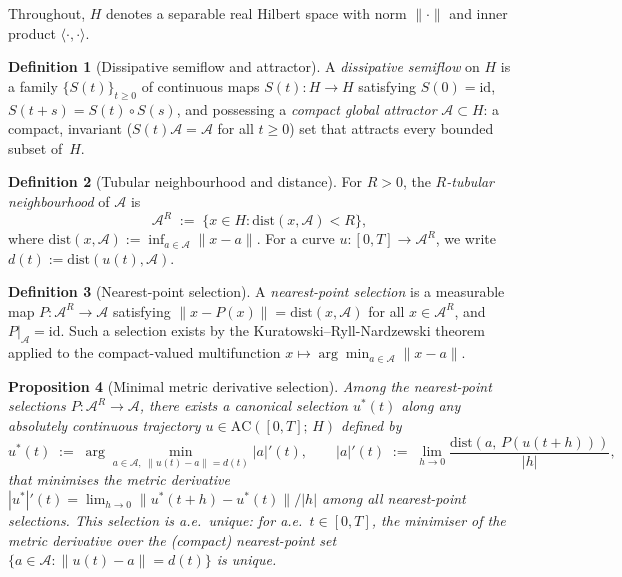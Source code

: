 \documentclass[12pt,a4paper]{article}
\theoremstyle{definition}
\newtheorem{definition}{Definition}[section]
\theoremstyle{plain}
\newtheorem{proposition}[definition]{Proposition}
\theoremstyle{remark}
\newcommand{\dist}{\mathrm{dist}}
\newcommand{\AC}{\mathrm{AC}}
\newcommand{\id}{\mathrm{id}}
\begin{document}
Throughout, $H$ denotes a separable real Hilbert space with norm
$\|\cdot\|$ and inner product $\langle\cdot,\cdot\rangle$.

\begin{definition}[Dissipative semiflow and attractor]
\label{def:semiflow}
A \emph{dissipative semiflow} on $H$ is a family
$\{S(t)\}_{t \ge 0}$ of continuous maps $S(t): H \to H$ satisfying
$S(0) = \id$, $S(t+s) = S(t) \circ S(s)$, and possessing a
\emph{compact global attractor}
$\mathcal{A} \subset H$: a compact, invariant
($S(t)\mathcal{A} = \mathcal{A}$ for all $t \ge 0$) set that
attracts every bounded subset of~$H$.
\end{definition}

\begin{definition}[Tubular neighbourhood and distance]
\label{def:tube}
For $R > 0$, the \emph{$R$-tubular neighbourhood} of $\mathcal{A}$ is
\[
  \mathcal{A}^R
  \;:=\;
  \{x \in H : \dist(x, \mathcal{A}) < R\},
\]
where $\dist(x, \mathcal{A}) := \inf_{a \in \mathcal{A}} \|x - a\|$.
For a curve $u: [0,T] \to \mathcal{A}^R$, we write
$d(t) := \dist(u(t), \mathcal{A})$.
\end{definition}

\begin{definition}[Nearest-point selection]
\label{def:selection}
A \emph{nearest-point selection} is a measurable map
$P: \mathcal{A}^R \to \mathcal{A}$ satisfying
$\|x - P(x)\| = \dist(x, \mathcal{A})$ for all
$x \in \mathcal{A}^R$, and $P|_{\mathcal{A}} = \id$.
Such a selection exists by the Kuratowski--Ryll-Nardzewski theorem
applied to the compact-valued multifunction
$x \mapsto \arg\min_{a \in \mathcal{A}} \|x-a\|$.
\end{definition}

\begin{proposition}[Minimal metric derivative selection]
\label{prop:minimal-selection}
Among the nearest-point selections
$P: \mathcal{A}^R \to \mathcal{A}$, there exists a
\emph{canonical selection} $u^*(t)$ along any absolutely continuous
trajectory $u \in \AC([0,T];\,H)$ defined by
\[
  u^*(t)
  \;:=\;
  \arg\min_{a \in \mathcal{A},\;\|u(t)-a\|=d(t)}
  |a|'(t),
  \qquad
  |a|'(t)
  \;:=\;
  \lim_{h \to 0}
  \frac{\dist(a,\,P(u(t+h)))}{|h|},
\]
that minimises the metric derivative
$|u^*|'(t) = \lim_{h\to 0} \|u^*(t+h) - u^*(t)\|/|h|$
among all nearest-point selections.  This selection is
a.e.\ unique: for a.e.\ $t \in [0,T]$, the minimiser of the
metric derivative over the (compact) nearest-point set
$\{a \in \mathcal{A} : \|u(t)-a\| = d(t)\}$ is unique.
\end{proposition}
\end{document}
